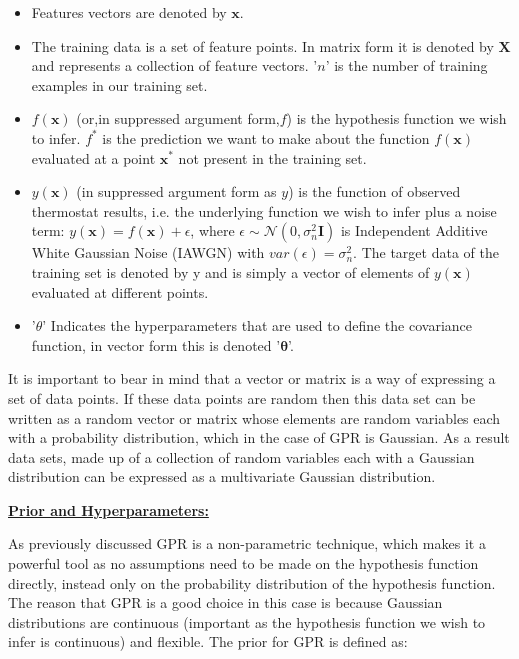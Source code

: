 \documentclass[10.5pt,a4paper,twoside]{report}   %
\begin{document}
\begin{itemize}
\item Features vectors are denoted by $\boldsymbol{x}$. 
\item The training data is a set of feature points. In matrix form it is denoted by $\boldsymbol{X}$ and represents a collection of feature vectors. '$n$' is the number of training examples in our training set.
\item $f(\boldsymbol{x})$  (or,in suppressed argument form,$f$) is the hypothesis function we wish to infer. $f^\ast$ is the prediction we want to make about the function $f(\boldsymbol{x})$ evaluated at a point $\boldsymbol{x}^\ast$ not present in the training set. 
\item $y(\boldsymbol{x})$ (in suppressed argument form as $y$) is the function of observed thermostat results, i.e. the underlying function we wish to infer plus a noise term: $y(\boldsymbol{x})=f(\boldsymbol{x})+\epsilon$, where $\epsilon \sim \mathcal{N} (0,\sigma_{n}^2 \boldsymbol{I})$ is Independent Additive White Gaussian Noise (IAWGN) with $var(\epsilon)=\sigma_{n}^2$. The target data of the training set is denoted by y and is simply a vector of elements of $y(\boldsymbol{x})$ evaluated at different points.
\item '$\theta$' Indicates the hyperparameters that are used to define the covariance function, in vector form this is denoted '$\boldsymbol{\theta}$'.
\end{itemize}

It is important to bear in mind that a vector or matrix is a way of expressing a set of data points. If these data points are random then this data set can be written as a random vector or matrix whose elements are random variables each with a probability distribution, which in the case of GPR is Gaussian.  As a result data sets, made up of a collection of random variables each with a Gaussian distribution can be expressed as a multivariate Gaussian distribution.

\noindent \underline{\textbf{Prior and Hyperparameters:}}

As previously discussed GPR is a non-parametric technique, which makes it a powerful tool as no assumptions need to be made on the hypothesis function directly, instead only on the probability distribution of the hypothesis function. The reason that GPR is a good choice in this case is because Gaussian distributions are continuous (important as the hypothesis function we wish to infer is continuous) and flexible. The prior for GPR is defined as:
\end{document}
